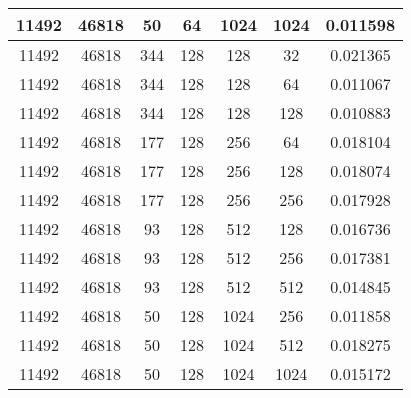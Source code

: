 \documentclass[9pt]{article}
\begin{document}
\begin{tabular}{|c|c|c|c|c|c|c| }
\hline
11492  & 46818  & 50  & 64  & 1024  & 1024  & 0.011598 \\
\hline
11492  & 46818  & 344  & 128  & 128  & 32  & 0.021365 \\
\hline
11492  & 46818  & 344  & 128  & 128  & 64  & 0.011067 \\
\hline
11492  & 46818  & 344  & 128  & 128  & 128  & 0.010883 \\
\hline
11492  & 46818  & 177  & 128  & 256  & 64  & 0.018104 \\
\hline
11492  & 46818  & 177  & 128  & 256  & 128  & 0.018074 \\
\hline
11492  & 46818  & 177  & 128  & 256  & 256  & 0.017928 \\
\hline
11492  & 46818  & 93  & 128  & 512  & 128  & 0.016736 \\
\hline
11492  & 46818  & 93  & 128  & 512  & 256  & 0.017381 \\
\hline
11492  & 46818  & 93  & 128  & 512  & 512  & 0.014845 \\
\hline
11492  & 46818  & 50  & 128  & 1024  & 256  & 0.011858 \\
\hline
11492  & 46818  & 50  & 128  & 1024  & 512  & 0.018275 \\
\hline
11492  & 46818  & 50  & 128  & 1024  & 1024  & 0.015172 \\
\hline
\end{tabular}
 
\end{document}
